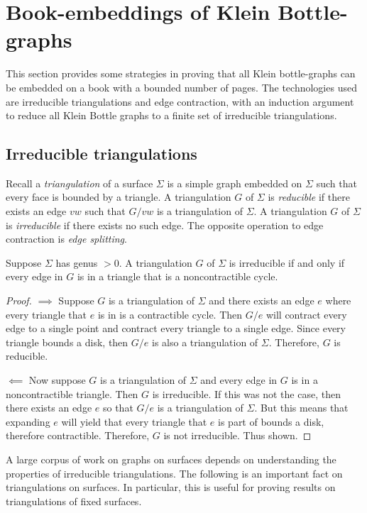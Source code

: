 \section{Book-embeddings of Klein Bottle-graphs}
This section provides some strategies in proving that all Klein bottle-graphs can be embedded on a book with a bounded number of pages. The technologies used are irreducible triangulations and edge contraction, with an induction argument to reduce all Klein Bottle graphs to a finite set of irreducible triangulations.

\subsection{Irreducible triangulations}
Recall a \textit{triangulation} of a surface $\Sigma$ is a simple graph embedded on $\Sigma$ such that every face is bounded by a triangle. A triangulation $G$ of $\Sigma$ is \textit{reducible} if there exists an edge $vw$ such that $G / vw$ is a triangulation of $\Sigma$. A triangulation $G$ of $\Sigma$ is \textit{irreducible} if there exists no such edge. The opposite operation to edge contraction is \textit{edge splitting}. 

\begin{proposition}
    Suppose $\Sigma$ has genus $> 0$. A triangulation $G$ of $\Sigma$ is irreducible if and only if every edge in $G$ is in a triangle that is a noncontractible cycle.
\end{proposition}

\begin{proof}
    $\implies$ Suppose $G$ is a triangulation of $\Sigma$ and there exists an edge $e$ where every triangle that $e$ is in is a contractible cycle. Then $G/ e$ will contract every edge to a single point and contract every triangle to a single edge. Since every triangle bounds a disk, then $G / e$ is also a triangulation of $\Sigma$. Therefore, $G$ is reducible. 

    $\impliedby$ Now suppose $G$ is a triangulation of $\Sigma$ and every edge in $G$ is in a noncontractible triangle. Then $G$ is irreducible. If this was not the case, then there exists an edge $e$ so that $G / e$ is a triangulation of $\Sigma$. But this means that expanding $e$ will yield that every triangle that $e$ is part of bounds a disk, therefore contractible. Therefore, $G$ is not irreducible. Thus shown. 
\end{proof}

A large corpus of work on graphs on surfaces depends on understanding the properties of irreducible triangulations. The following is an important fact on triangulations on surfaces. In particular, this is useful for proving results on triangulations of fixed surfaces. 

